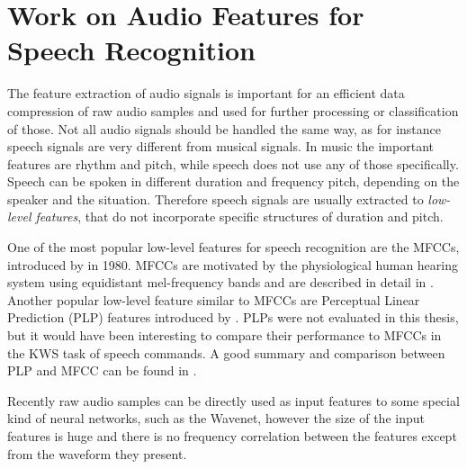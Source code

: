 
\section{Work on Audio Features for Speech Recognition}\label{sec:prev_features}
The feature extraction of audio signals is important for an efficient data compression of raw audio samples and used for further processing or classification of those.
Not all audio signals should be handled the same way, as for instance speech signals are very different from musical signals.
In music the important features are rhythm and pitch, while speech does not use any of those specifically.
Speech can be spoken in different duration and frequency pitch, depending on the speaker and the situation.
Therefore speech signals are usually extracted to \emph{low-level features}, that do not incorporate specific structures of duration and pitch.

One of the most popular low-level features for speech recognition are the MFCCs, introduced by \cite{Mermelstein1980} in 1980.
MFCCs are motivated by the physiological human hearing system using equidistant mel-frequency bands and are described in detail in .
Another popular low-level feature similar to MFCCs are Perceptual Linear Prediction (PLP) features introduced by \cite{Hermansky1987}.
PLPs were not evaluated in this thesis, but it would have been interesting to compare their performance to MFCCs in the KWS task of speech commands.
A good summary and comparison between PLP and MFCC can be found in \cite{Hoenig2005}.

Recently raw audio samples can be directly used as input features to some special kind of neural networks, such as the Wavenet, however the size of the input features is huge and there is no frequency correlation between the features except from the waveform they present.